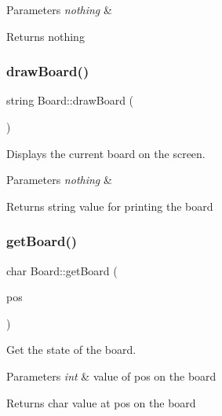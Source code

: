 \begin{DoxyParams}{Parameters}
{\em nothing} & \\
\hline
\end{DoxyParams}
\begin{DoxyReturn}{Returns}
nothing 
\end{DoxyReturn}
\mbox{\label{classBoard_a8fb1cd277d1dd029baeda80ec8e65756}} 
\subsubsection{\texorpdfstring{draw\+Board()}{drawBoard()}}
{\footnotesize\ttfamily string Board\+::draw\+Board (\begin{DoxyParamCaption}{ }\end{DoxyParamCaption})}



Displays the current board on the screen. 


\begin{DoxyParams}{Parameters}
{\em nothing} & \\
\hline
\end{DoxyParams}
\begin{DoxyReturn}{Returns}
string value for printing the board 
\end{DoxyReturn}
\mbox{\label{classBoard_af7e9c87bb428473eb051ca19ee36ca95}} 
\subsubsection{\texorpdfstring{get\+Board()}{getBoard()}}
{\footnotesize\ttfamily char Board\+::get\+Board (\begin{DoxyParamCaption}\item[{const int}]{pos }\end{DoxyParamCaption})}



Get the state of the board. 


\begin{DoxyParams}{Parameters}
{\em int} & value of pos on the board \\
\hline
\end{DoxyParams}
\begin{DoxyReturn}{Returns}
char value at pos on the board 
\end{DoxyReturn}
\mbox{\label{classBoard_a3707ab499357d887c1be4e2bbb477891}} 
